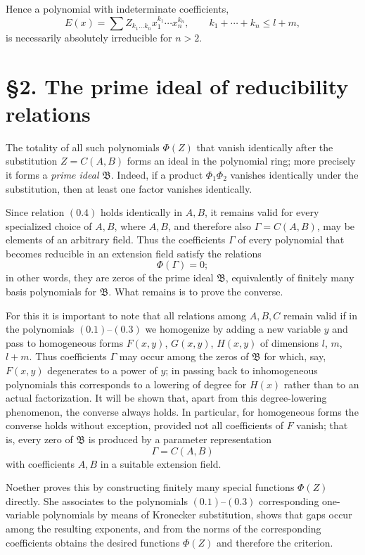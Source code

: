 \documentclass[11pt]{article}
\begin{document}
Hence a polynomial with indeterminate coefficients,
\[
E(x)=\sum Z_{k_1\dots k_n}x_1^{k_1}\cdots x_n^{k_n},
\qquad k_1+\cdots+k_n\le l+m,
\tag{0.5}
\]
is necessarily absolutely irreducible for $n>2$.

\section*{\S 2. The prime ideal of reducibility relations}

The totality of all such polynomials $\Phi(Z)$ that vanish identically after the substitution $Z=C(A,B)$ forms an ideal in the polynomial ring; more precisely it forms a \emph{prime ideal} $\mathfrak B$. Indeed, if a product $\Phi_1\Phi_2$ vanishes identically under the substitution, then at least one factor vanishes identically.

Since relation \((0.4)\) holds identically in $A,B$, it remains valid for every specialized choice of $A,B$, where $A,B$, and therefore also $\Gamma=C(A,B)$, may be elements of an arbitrary field. Thus the coefficients $\Gamma$ of every polynomial that becomes reducible in an extension field satisfy the relations
\[
\Phi(\Gamma)=0;
\]
in other words, they are zeros of the prime ideal $\mathfrak B$, equivalently of finitely many basis polynomials for $\mathfrak B$. What remains is to prove the converse.

For this it is important to note that all relations among $A,B,C$ remain valid if in the polynomials \((0.1)\)--\((0.3)\) we homogenize by adding a new variable $y$ and pass to homogeneous forms $F(x,y)$, $G(x,y)$, $H(x,y)$ of dimensions $l$, $m$, $l+m$. Thus coefficients $\Gamma$ may occur among the zeros of $\mathfrak B$ for which, say, $F(x,y)$ degenerates to a power of $y$; in passing back to inhomogeneous polynomials this corresponds to a lowering of degree for $H(x)$ rather than to an actual factorization. It will be shown that, apart from this degree-lowering phenomenon, the converse always holds. In particular, for homogeneous forms the converse holds without exception, provided not all coefficients of $F$ vanish; that is, every zero of $\mathfrak B$ is produced by a parameter representation
\[
\Gamma=C(A,B)
\]
with coefficients $A,B$ in a suitable extension field.

Noether proves this by constructing finitely many special functions $\Phi(Z)$ directly. She associates to the polynomials \((0.1)\)--\((0.3)\) corresponding one-variable polynomials by means of Kronecker substitution, shows that gaps occur among the resulting exponents, and from the norms of the corresponding coefficients obtains the desired functions $\Phi(Z)$ and therefore the criterion.
\end{document}
